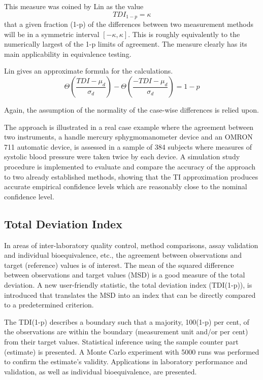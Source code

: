 \documentclass[MAIN.tex]{subfiles}
\begin{document}
	This measure was coined by Lin as the value \[TDI_{1-p} = \kappa\] that a given fraction (1-p) of the differences between two measurement methods will be in a symmetric interval $[-\kappa,\kappa]$.
	This is roughly equivalently to the numerically largest of the 1-p limits of agreement.
	The measure clearly has its main applicability in equivalence testing. 
	
	Lin gives an approximate formula for the calculations.
	\[\Theta \left( \frac{ TDI - \mu_d}{\sigma_d} \right) - \Theta \left(  \frac{ -TDI - \mu_d}{\sigma_d} \right) = 1-p\]
	
	Again, the assumption of the normality of the case-wise differences is relied upon.
	
	The approach is illustrated in a real case example where the agreement between two instruments, a handle mercury sphygmomanometer device and an OMRON 711 automatic device, is assessed in a sample of 384 subjects where measures of systolic blood pressure were taken twice by each device. A simulation study procedure is implemented to evaluate and compare the accuracy of the approach to two already established methods, showing that the TI approximation produces accurate empirical confidence levels which are reasonably close to the nominal confidence level.


\subsection*{Total Deviation Index}
In areas of inter-laboratory quality control, method comparisons, assay validation and individual bioequivalence, etc., the agreement between observations and target (reference) values is of interest. The mean of the squared difference between observations and target values (MSD) is a good measure of the total deviation. A new user-friendly statistic, the total deviation index (TDI(1-p)), is introduced that translates the MSD into an index that can be directly compared to a predetermined criterion. 

The TDI(1-p) describes a boundary such that a majority, 100(1-p) per cent, of the observations are within the boundary (measurement unit and/or per cent) from their target values. Statistical inference using the sample counter part (estimate) is presented. A Monte Carlo experiment with 5000 runs was performed to confirm the estimate's validity. Applications in laboratory performance and validation, as well as individual bioequivalence, are presented.
\end{document}
